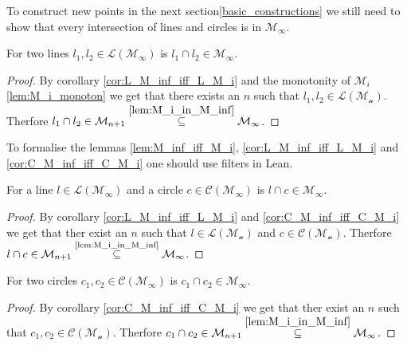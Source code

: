 To construct new points in the next section\ref{basic_constructions} we still need to show that every intersection of lines and circles is in $\mathcal{M}_{\infty}$.
\begin{lemma}
    \label{lem:ill_M_inf}
    \leanok
    For two lines $l_1, l_2 \in \mathcal{L(M_{\infty})}$ is $l_1 \cap l_2 \in \mathcal{M}_{\infty}$.
\end{lemma}
\begin{proof}
    By corollary \ref{cor:L_M_inf_iff_L_M_i} and the monotonity of $\mathcal{M}_i$ \ref{lem:M_i_monoton} we get that there exists an $n$ such that $l_1, l_2 \in \mathcal{L(M_n)}$.
    Therfore $l_1 \cap l_2 \in \mathcal{M}_{n+1} \stackrel{\ref{lem:M_i_in_M_inf}}{\subseteq} \mathcal{M}_{\infty}$.
\end{proof}

\begin{remark}%
    To formalise the lemmas \ref{lem:M_inf_iff_M_i}, \ref{cor:L_M_inf_iff_L_M_i} and \ref{cor:C_M_inf_iff_C_M_i} one should use filters in Lean.
\end{remark}

\begin{lemma}
    \label{lem:ilc_M_inf}
    \leanok
    For a line $l \in \mathcal{L(M_{\infty})}$ and a circle $c \in \mathcal{C(M_{\infty})}$ is $l \cap c \in \mathcal{M}_{\infty}$.
\end{lemma}
\begin{proof}
    By corollary \ref{cor:L_M_inf_iff_L_M_i} and \ref{cor:C_M_inf_iff_C_M_i} we get that ther exist an $n$ such that $l \in \mathcal{L(M_n)}$ and $c \in \mathcal{C(M_n)}$.
    Therfore $l \cap c \in \mathcal{M}_{n+1} \stackrel{\text{\ref{lem:M_i_in_M_inf}}}{\subseteq} \mathcal{M}_{\infty}$.
\end{proof}

\begin{lemma}
    \label{lem:icc_M_inf}
    \leanok
    For two circles $c_1, c_2 \in \mathcal{C(M_{\infty})}$ is $c_1 \cap c_2 \in \mathcal{M}_{\infty}$.
\end{lemma}
\begin{proof}
    By corollary \ref{cor:C_M_inf_iff_C_M_i} we get that ther exist an $n$ such that $c_1, c_2 \in \mathcal{C(M_n)}$.
    Therfore $c_1 \cap c_2 \in \mathcal{M}_{n+1} \stackrel{\ref{lem:M_i_in_M_inf}}{\subseteq} \mathcal{M}_{\infty}$.
\end{proof}


